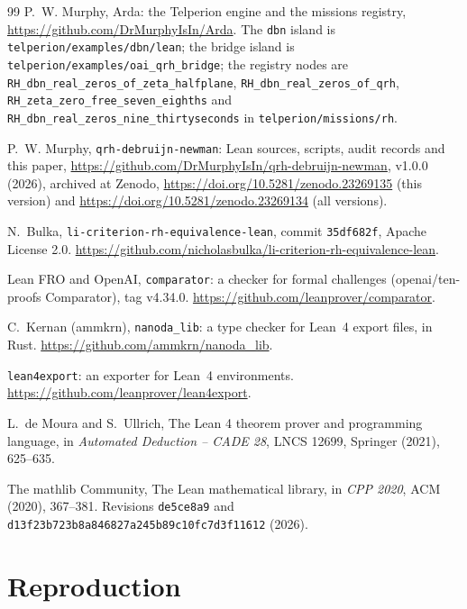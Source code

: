 \documentclass[11pt]{article}
\theoremstyle{definition}
\begin{document}
\begin{thebibliography}{99}
 P.~W. Murphy, Arda: the Telperion engine and the missions registry, \url{https://github.com/DrMurphyIsIn/Arda}. The \texttt{dbn} island is \texttt{telperion/examples/dbn/lean}; the bridge island is \texttt{telperion/examples/oai\_qrh\_bridge}; the registry nodes are \texttt{RH\_dbn\_real\_zeros\_of\_zeta\_halfplane}, \texttt{RH\_dbn\_real\_zeros\_of\_qrh}, \texttt{RH\_zeta\_zero\_free\_seven\_eighths} and \texttt{RH\_dbn\_real\_zeros\_nine\_thirtyseconds} in \texttt{telperion/missions/rh}.

 P.~W. Murphy, \texttt{qrh-debruijn-newman}: Lean sources, scripts, audit records and this paper, \url{https://github.com/DrMurphyIsIn/qrh-debruijn-newman}, v1.0.0 (2026), archived at Zenodo, \url{https://doi.org/10.5281/zenodo.23269135} (this version) and \url{https://doi.org/10.5281/zenodo.23269134} (all versions).

 N.~Bulka, \texttt{li-criterion-rh-equivalence-lean}, commit \texttt{35df682f}, Apache License 2.0. \url{https://github.com/nicholasbulka/li-criterion-rh-equivalence-lean}.

 Lean FRO and OpenAI, \texttt{comparator}: a checker for formal challenges (openai/ten-proofs Comparator), tag v4.34.0. \url{https://github.com/leanprover/comparator}.

 C.~Kernan (ammkrn), \texttt{nanoda\_lib}: a type checker for Lean~4 export files, in Rust. \url{https://github.com/ammkrn/nanoda_lib}.

 \texttt{lean4export}: an exporter for Lean~4 environments. \url{https://github.com/leanprover/lean4export}.

 L.~de Moura and S.~Ullrich, The Lean 4 theorem prover and programming language, in \emph{Automated Deduction -- CADE 28}, LNCS 12699, Springer (2021), 625--635.

 The mathlib Community, The Lean mathematical library, in \emph{CPP 2020}, ACM (2020), 367--381. Revisions \texttt{de5ce8a9} and \texttt{d13f23b723b8a846827a245b89c10fc7d3f11612} (2026).

\end{thebibliography}

\appendix

\section{Reproduction}\label{app:repro}
\end{document}

